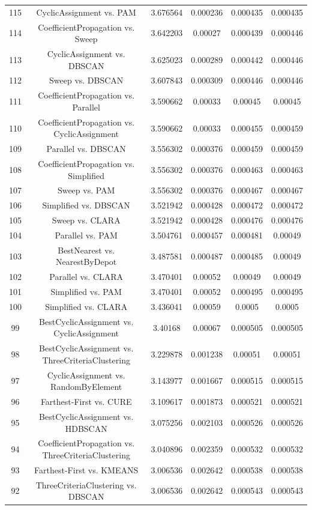 \documentclass[a4paper,10pt]{article}
\begin{document}
\begin{landscape}
\begin{table}[!htp]
\begin{tabular}{cccccc}
115&CyclicAssignment vs. PAM&3.676564&0.000236&0.000435&0.000435\\
114&CoefficientPropagation vs. Sweep&3.642203&0.00027&0.000439&0.000446\\
113&CyclicAssignment vs. DBSCAN&3.625023&0.000289&0.000442&0.000446\\
112&Sweep vs. DBSCAN&3.607843&0.000309&0.000446&0.000446\\
111&CoefficientPropagation vs. Parallel&3.590662&0.00033&0.00045&0.00045\\
110&CoefficientPropagation vs. CyclicAssignment&3.590662&0.00033&0.000455&0.000459\\
109&Parallel vs. DBSCAN&3.556302&0.000376&0.000459&0.000459\\
108&CoefficientPropagation vs. Simplified&3.556302&0.000376&0.000463&0.000463\\
107&Sweep vs. PAM&3.556302&0.000376&0.000467&0.000467\\
106&Simplified vs. DBSCAN&3.521942&0.000428&0.000472&0.000472\\
105&Sweep vs. CLARA&3.521942&0.000428&0.000476&0.000476\\
104&Parallel vs. PAM&3.504761&0.000457&0.000481&0.00049\\
103&BestNearest vs. NearestByDepot&3.487581&0.000487&0.000485&0.00049\\
102&Parallel vs. CLARA&3.470401&0.00052&0.00049&0.00049\\
101&Simplified vs. PAM&3.470401&0.00052&0.000495&0.000495\\
100&Simplified vs. CLARA&3.436041&0.00059&0.0005&0.0005\\
99&BestCyclicAssignment vs. CyclicAssignment&3.40168&0.00067&0.000505&0.000505\\
98&BestCyclicAssignment vs. ThreeCriteriaClustering&3.229878&0.001238&0.00051&0.00051\\
97&CyclicAssignment vs. RandomByElement&3.143977&0.001667&0.000515&0.000515\\
96&Farthest-First vs. CURE&3.109617&0.001873&0.000521&0.000521\\
95&BestCyclicAssignment vs. HDBSCAN&3.075256&0.002103&0.000526&0.000526\\
94&CoefficientPropagation vs. ThreeCriteriaClustering&3.040896&0.002359&0.000532&0.000532\\
93&Farthest-First vs. KMEANS&3.006536&0.002642&0.000538&0.000538\\
92&ThreeCriteriaClustering vs. DBSCAN&3.006536&0.002642&0.000543&0.000543\\

\end{tabular}
\end{table}
\end{landscape}
\end{document}

